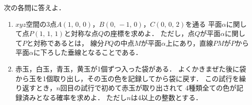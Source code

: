 \documentclass[../../main.tex]{subfiles}
\begin{document}
次の各問に答えよ．
\begin{enumerate}
  \item[問1]$xyz$空間の3点$A(1, \, 0, \, 0)$，$B(0, \, -1, \, 0)$，$C(0, \, 0, \, 2)$を通る
    平面$\alpha$に関して点$P(1, \, 1, \, 1)$と対称な点$Q$の座標を求めよ．
    ただし，点$Q$が平面$\alpha$に関して$P$と対称であるとは，
    線分$PQ$の中点$M$が平面$\alpha$上にあり，直線$PM$が$P$から平面$\alpha$に下ろした垂線となることである．
  \item[問2]赤玉，白玉，青玉，黄玉が1個ずつ入った袋がある．
    よくかきまぜた後に袋から玉を1個取り出し，その玉の色を記録してから袋に戻す．
    この試行を繰り返すとき，$n$回目の試行で初めて赤玉が取り出されて
    4種類全ての色が記録済みとなる確率を求めよ．
    ただし$n$は4以上の整数とする．
\end{enumerate}
\end{document}
